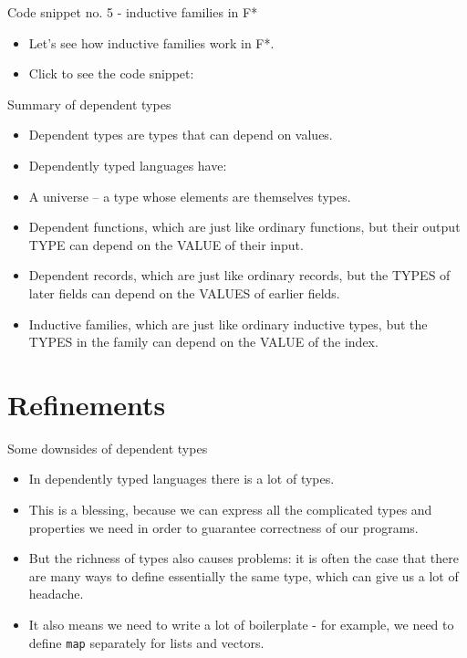\documentclass{beamer}
\newcommand{\m}[1]{\texttt{#1}}
\begin{document}
\begin{frame}{Code snippet no. 5 - inductive families in F*}
\begin{itemize}
	\item Let's see how inductive families work in F*.
	\item Click to see the code snippet: \href{https://github.com/wkolowski/Dependent-Types-and-Theorem-Proving/blob/master/Code/InductiveFamilies.fst}{\color{blue}{Code/InductiveFamilies.fst}}
\end{itemize}
\end{frame}

\begin{frame}{Summary of dependent types}
\begin{itemize}
	\item Dependent types are types that can depend on values.
	\item Dependently typed languages have:
	\item A universe -- a type whose elements are themselves types.
	\item Dependent functions, which are just like ordinary functions, but their output TYPE can depend on the VALUE of their input.
	\item Dependent records, which are just like ordinary records, but the TYPES of later fields can depend on the VALUES of earlier fields.
	\item Inductive families, which are just like ordinary inductive types, but the TYPES in the family can depend on the VALUE of the index.
\end{itemize}
\end{frame}

\section{Refinements}

\begin{frame}{Some downsides of dependent types}
\begin{itemize}
    \item In dependently typed languages there is a lot of types.
    \item This is a blessing, because we can express all the complicated types and properties we need in order to guarantee correctness of our programs.
    \item But the richness of types also causes problems: it is often the case that there are many ways to define essentially the same type, which can give us a lot of headache.
    \item It also means we need to write a lot of boilerplate - for example, we need to define \m{map} separately for lists and vectors.
\end{itemize}
\end{frame}
\end{document}
